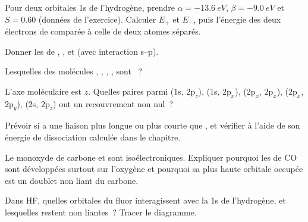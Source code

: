 \begin{exercise}[$\star$]\label{exo:b2:diatomic-mos:1}
Pour deux orbitales 1s de l'hydrogène, prendre $\alpha = \qty{-13.6}{eV}$, $\beta = \qty{-9.0}{eV}$ et
$S = 0.60$ (données de l'exercice). Calculer $E_+$ et $E_-$, puis l'énergie des deux
électrons de  comparée à celle de deux atomes séparés.
\end{exercise}

\begin{exercise}[$\star$]\label{exo:b2:diatomic-mos:2}
Donner les  de , ,  et  (avec interaction
s--p).
\end{exercise}

\begin{exercise}[$\star$]\label{exo:b2:diatomic-mos:3}
Lesquelles des molécules , , , ,  sont ~?
\end{exercise}

\begin{exercise}[$\star$]\label{exo:b2:diatomic-mos:4}
L'axe moléculaire est $z$. Quelles paires parmi (1s, $2\mathrm p_z$), (1s,
$2\mathrm p_x$), ($2\mathrm p_x$, $2\mathrm p_x$), ($2\mathrm p_x$, $2\mathrm p_y$),
(2s, $2\mathrm p_z$) ont un recouvrement non nul~?
\end{exercise}

\begin{exercise}[$\star\star$]\label{exo:b2:diatomic-mos:5}
Prévoir si  a une liaison plus longue ou plus courte que , et vérifier à l'aide de
son énergie de dissociation calculée dans le chapitre.
\end{exercise}

\begin{exercise}[$\star\star$]\label{exo:b2:diatomic-mos:6}
Le monoxyde de carbone et  sont isoélectroniques. Expliquer pourquoi les  de
CO sont développées surtout sur l'oxygène et pourquoi sa plus haute orbitale occupée est un doublet non liant du
carbone.
\end{exercise}

\begin{exercise}[$\star\star$]\label{exo:b2:diatomic-mos:7}
Dans HF, quelles orbitales du fluor interagissent avec la 1s de l'hydrogène, et lesquelles restent
non liantes~? Tracer le diagramme.
\end{exercise}

